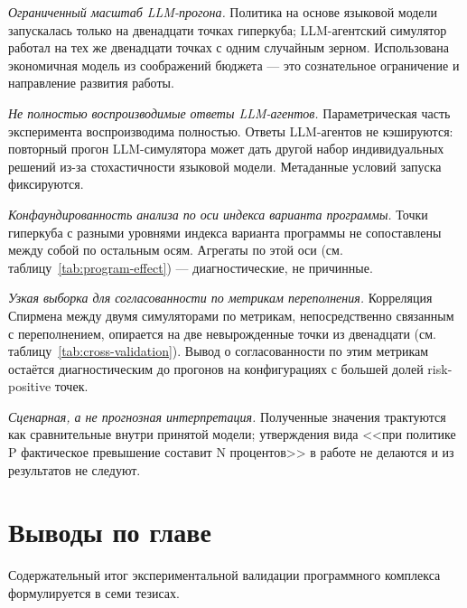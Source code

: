 \textit{Ограниченный масштаб LLM-прогона.} Политика на основе языковой модели запускалась только на двенадцати точках гиперкуба; LLM-агентский симулятор работал на тех же двенадцати точках с одним случайным зерном. Использована экономичная модель из соображений бюджета --- это сознательное ограничение и направление развития работы.

\textit{Не полностью воспроизводимые ответы LLM-агентов.} Параметрическая часть эксперимента воспроизводима полностью. Ответы LLM-агентов не кэшируются: повторный прогон LLM-симулятора может дать другой набор индивидуальных решений из-за стохастичности языковой модели. Метаданные условий запуска фиксируются.

\textit{Конфаундированность анализа по оси индекса варианта программы.} Точки гиперкуба с разными уровнями индекса варианта программы не сопоставлены между собой по остальным осям. Агрегаты по этой оси (см. таблицу~\ref{tab:program-effect}) --- диагностические, не причинные.

\textit{Узкая выборка для согласованности по метрикам переполнения.} Корреляция Спирмена между двумя симуляторами по метрикам, непосредственно связанным с переполнением, опирается на две невырожденные точки из двенадцати (см. таблицу~\ref{tab:cross-validation}). Вывод о согласованности по этим метрикам остаётся диагностическим до прогонов на конфигурациях с большей долей risk-positive точек.

\textit{Сценарная, а не прогнозная интерпретация.} Полученные значения трактуются как сравнительные внутри принятой модели; утверждения вида <<при политике P фактическое превышение составит N процентов>> в работе не делаются и из результатов не следуют.


\section{Выводы по главе}
\label{sec:4-9}

Содержательный итог экспериментальной валидации программного комплекса формулируется в семи тезисах.

